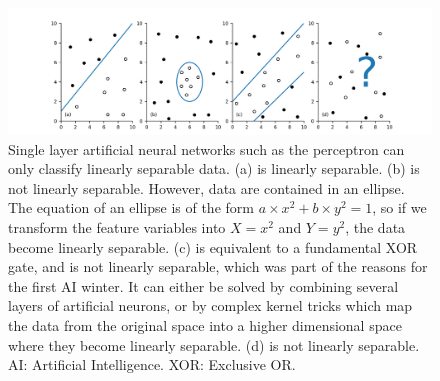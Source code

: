 



\begin{figure}[hbtp]
	\centering
	\def\svgwidth{1\columnwidth}
	\fontsize{10pt}{10pt}\selectfont
	\includegraphics[width=\linewidth]{"../Chap2/Figures/Fig_linearly_sep.png"}
	\caption{Single layer artificial neural networks such as the perceptron can only classify linearly separable data. (a) is linearly separable. (b) is not linearly separable. However, data are contained in an ellipse. The equation of an ellipse is of the form \(a \times x^2+b\times y^2=1\), so if we transform the feature variables into \(X=x^2\) and \(Y=y^2\), the data become linearly separable. (c) is equivalent to a fundamental XOR gate, and is not linearly separable, which was part of the reasons for the first AI winter. It can either be solved by combining several layers of artificial neurons, or by complex kernel tricks which map the data from the original space into a higher dimensional space where they become linearly separable. (d) is not linearly separable. AI: Artificial Intelligence. XOR: Exclusive OR.} 
	\label{fig_linearly_sep}
\end{figure}

